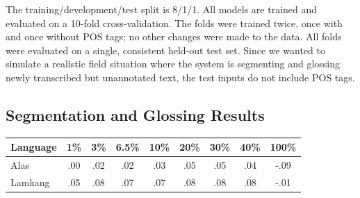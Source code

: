 The training/development/test split is 8/1/1. All models are trained and evaluated on a 10-fold cross-validation. The folds were trained twice, once with and once without POS tags; no other changes were made to the data. All folds were evaluated on a single, consistent held-out test set. Since we wanted to simulate a realistic field situation where the system is segmenting and glossing newly transcribed but unannotated text, the test inputs do not include POS tags. 


\subsection{Segmentation and Glossing Results}
\label{sec:segglsresults}


\begin{table}[b]
    \centering
    \begin{tabular}{l|cccccccc}
       \textbf{Language} & \textbf{1\%} & \textbf{3\%} & \textbf{6.5\%} & \textbf{10\%} & \textbf{20\%} & \textbf{30\%} & \textbf{40\%} & \textbf{100\%} \\
       \hline
        Alas & .00 & .02 & .02 & .03 & .05 & .05 & .04 & -.09 \\
       \hline
       Lamkang & .05 & .08 & .07 & .07 & .08 & .08 & .08 & -.01 \\
       \hline

\end{tabular}
\end{table}

